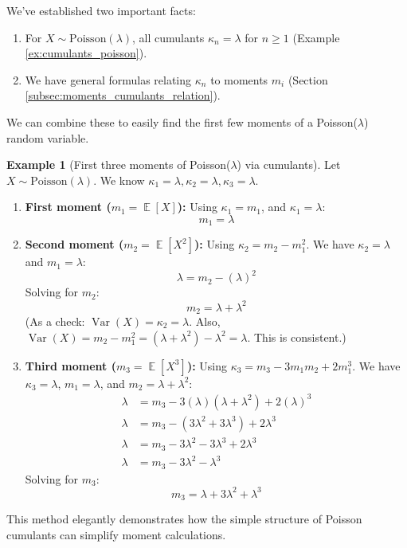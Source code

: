 \documentclass[11pt, letterpaper]{article}
\theoremstyle{plain} %
\theoremstyle{definition} %
\newtheorem{example}[theorem]{Example}
\theoremstyle{remark} %
\DeclareMathOperator{\E}{\mathbb{E}}
\DeclareMathOperator{\Var}{\mathrm{Var}}
\newcommand{\Pois}{\mathrm{Poisson}}
\begin{document}
We've established two important facts:
\begin{enumerate}
    \item For $X \sim \Pois(\lambda)$, all cumulants $\kappa_n = \lambda$ for $n \ge 1$ (Example \ref{ex:cumulants_poisson}).
    \item We have general formulas relating $\kappa_n$ to moments $m_i$ (Section \ref{subsec:moments_cumulants_relation}).
\end{enumerate}
We can combine these to easily find the first few moments of a Poisson($\lambda$) random variable.

\begin{example}[First three moments of Poisson($\lambda$) via cumulants]
\label{ex:poisson_moments_from_cumulants}
Let $X \sim \Pois(\lambda)$. We know $\kappa_1=\lambda, \kappa_2=\lambda, \kappa_3=\lambda$.
\begin{enumerate}[label=(\alph*)]
    \item \textbf{First moment ($m_1 = \E[X]$):}
    Using $\kappa_1 = m_1$, and $\kappa_1 = \lambda$:
    \[ m_1 = \lambda \]

    \item \textbf{Second moment ($m_2 = \E[X^2]$):}
    Using $\kappa_2 = m_2 - m_1^2$. We have $\kappa_2 = \lambda$ and $m_1 = \lambda$:
    \[ \lambda = m_2 - (\lambda)^2 \]
    Solving for $m_2$:
    \[ m_2 = \lambda + \lambda^2 \]
    (As a check: $\Var(X) = \kappa_2 = \lambda$. Also, $\Var(X) = m_2 - m_1^2 = (\lambda + \lambda^2) - \lambda^2 = \lambda$. This is consistent.)

    \item \textbf{Third moment ($m_3 = \E[X^3]$):}
    Using $\kappa_3 = m_3 - 3m_1m_2 + 2m_1^3$. We have $\kappa_3 = \lambda$, $m_1 = \lambda$, and $m_2 = \lambda + \lambda^2$:
    \begin{align*}
    \lambda &= m_3 - 3(\lambda)(\lambda + \lambda^2) + 2(\lambda)^3 \\
    \lambda &= m_3 - (3\lambda^2 + 3\lambda^3) + 2\lambda^3 \\
    \lambda &= m_3 - 3\lambda^2 - 3\lambda^3 + 2\lambda^3 \\
    \lambda &= m_3 - 3\lambda^2 - \lambda^3
    \end{align*}
    Solving for $m_3$:
    \[ m_3 = \lambda + 3\lambda^2 + \lambda^3 \]
\end{enumerate}
This method elegantly demonstrates how the simple structure of Poisson cumulants can simplify moment calculations.
\end{example}
\end{document}
